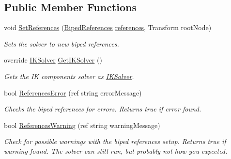 \subsection*{Public Member Functions}
\begin{DoxyCompactItemize}
\item 
void \mbox{\hyperlink{class_root_motion_1_1_final_i_k_1_1_full_body_biped_i_k_a824614a4b5c443a03dfff3a5edea0485}{Set\+References}} (\mbox{\hyperlink{class_root_motion_1_1_biped_references}{Biped\+References}} \mbox{\hyperlink{class_root_motion_1_1_final_i_k_1_1_full_body_biped_i_k_a0dfac5c2550dad76128806dd5fdc019b}{references}}, Transform root\+Node)
\begin{DoxyCompactList}\small\item\em Sets the solver to new biped references. \end{DoxyCompactList}\item 
override \mbox{\hyperlink{class_root_motion_1_1_final_i_k_1_1_i_k_solver}{I\+K\+Solver}} \mbox{\hyperlink{class_root_motion_1_1_final_i_k_1_1_full_body_biped_i_k_a40afaf3c61effbcc2ee82ad30c0b4bb7}{Get\+I\+K\+Solver}} ()
\begin{DoxyCompactList}\small\item\em Gets the IK component\textquotesingle{}s solver as \mbox{\hyperlink{class_root_motion_1_1_final_i_k_1_1_i_k_solver}{I\+K\+Solver}}. \end{DoxyCompactList}\item 
bool \mbox{\hyperlink{class_root_motion_1_1_final_i_k_1_1_full_body_biped_i_k_a8ce3c980aabd02250b0fbe4526a1cc0b}{References\+Error}} (ref string error\+Message)
\begin{DoxyCompactList}\small\item\em Checks the biped references for errors. Returns true if error found. \end{DoxyCompactList}\item 
bool \mbox{\hyperlink{class_root_motion_1_1_final_i_k_1_1_full_body_biped_i_k_a0668d64f894aa8f21ae2057c06788812}{References\+Warning}} (ref string warning\+Message)
\begin{DoxyCompactList}\small\item\em Check for possible warnings with the biped references setup. Returns true if warning found. The solver can still run, but probably not how you expected. \end{DoxyCompactList}\end{DoxyCompactItemize}

